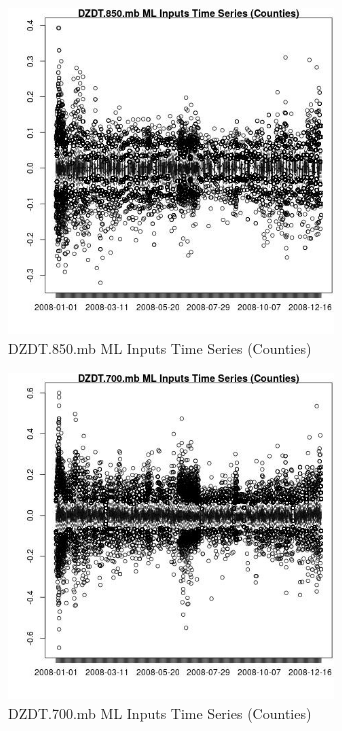 \begin{figure} 
\centering  
\includegraphics[width=0.77\textwidth]{Code_Outputs/ML_input_report_ML_input_CountyGeometricCentroids_Locations_Dates_part_c_2008-01-01to2008-12-31_DZDT.850.mbTS.jpg} 
\caption{\label{fig:ML_input_report_ML_input_CountyGeometricCentroids_Locations_Dates_part_c_2008-01-01to2008-12-31DZDT.850.mbTS}DZDT.850.mb ML Inputs Time Series (Counties)} 
\end{figure} 
 

\begin{figure} 
\centering  
\includegraphics[width=0.77\textwidth]{Code_Outputs/ML_input_report_ML_input_CountyGeometricCentroids_Locations_Dates_part_c_2008-01-01to2008-12-31_DZDT.700.mbTS.jpg} 
\caption{\label{fig:ML_input_report_ML_input_CountyGeometricCentroids_Locations_Dates_part_c_2008-01-01to2008-12-31DZDT.700.mbTS}DZDT.700.mb ML Inputs Time Series (Counties)} 
\end{figure} 
 

